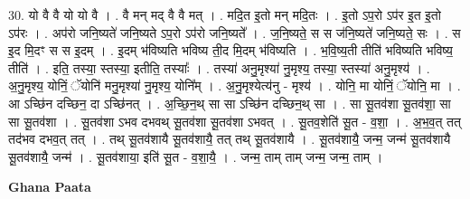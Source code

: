 \documentclass[17pt]{extarticle}
\begin{document}
30. यो वै वै यो यो वै । . वै मन् मद् वै वै मत् । . मदि॒त इ॒तो मन् मदि॒तः । . इ॒तो ऽप॒रो ऽप॑र इ॒त इ॒तो ऽप॑रः । . अप॑रो जनि॒ष्यते॑ जनि॒ष्यते ऽप॒रो ऽप॑रो जनि॒ष्यते᳚ । . ज॒नि॒ष्यते॒ स स ज॑नि॒ष्यते॑ जनि॒ष्यते॒ सः । . स इ॒द मि॒दꣳ स स इ॒दम् । . इ॒दम् भ॑विष्यति भविष्य ती॒द मि॒दम् भ॑विष्यति । . भ॒वि॒ष्य॒ती तीति॑ भविष्यति भविष्य॒ तीति॑ । . इति॒ तस्या॒ स्तस्या॒ इतीति॒ तस्याः᳚ । . तस्या॑ अनु॒मृश्या॑ नु॒मृश्य॒ तस्या॒ स्तस्या॑ अनु॒मृश्य॑ । . अ॒नु॒मृश्य॒ योनिं॒ ॅयोनि॑ मनु॒मृश्या॑ नु॒मृश्य॒ योनि᳚म् । . अ॒नु॒मृश्येत्य॑नु - मृश्य॑ । . योनि॒ मा योनिं॒ ॅयोनि॒ मा । . आ ऽच्छि॑न दच्छिन॒ दा ऽच्छि॑नत् । . अ॒च्छि॒न॒थ् सा सा ऽच्छि॑न दच्छिन॒थ् सा । . सा सू॒तव॑शा सू॒तव॑शा॒ सा सा सू॒तव॑शा । . सू॒तव॑शा ऽभव दभवथ् सू॒तव॑शा सू॒तव॑शा ऽभवत् । . सू॒तव॒शेति॑ सू॒त - व॒शा॒ । . अ॒भ॒व॒त् तत् तद॑भव दभव॒त् तत् । . तथ् सू॒तव॑शायै सू॒तव॑शायै॒ तत् तथ् सू॒तव॑शायै । . सू॒तव॑शायै॒ जन्म॒ जन्म॑ सू॒तव॑शायै सू॒तव॑शायै॒ जन्म॑ । . सू॒तव॑शाया॒ इति॑ सू॒त - व॒शा॒यै॒ । . जन्म॒ ताम् ताम् जन्म॒ जन्म॒ ताम् । \newline

\textbf{Ghana Paata } \newline
\end{document}
